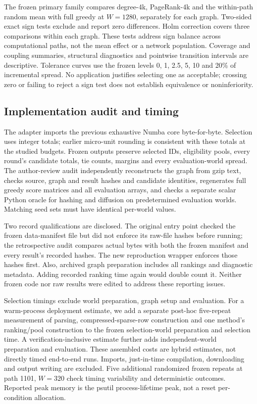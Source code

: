 \documentclass[smallextended]{svjour3}
\begin{document}
The frozen primary family compares degree-4k, PageRank-4k and the within-path random mean with full greedy at $W=1280$, separately for each graph. Two-sided exact sign tests exclude and report zero differences. Holm correction covers three comparisons within each graph. These tests address sign balance across computational paths, not the mean effect or a network population. Coverage and coupling summaries, structural diagnostics and pointwise transition intervals are descriptive. Tolerance curves use the frozen levels 0, 1, 2.5, 5, 10 and 20\% of incremental spread. No application justifies selecting one as acceptable; crossing zero or failing to reject a sign test does not establish equivalence or noninferiority.

\subsection{Implementation audit and timing}
The adapter imports the previous exhaustive Numba core byte-for-byte. Selection uses integer totals; earlier micro-unit rounding is consistent with these totals at the studied budgets. Frozen outputs preserve selected IDs, eligibility pools, every round's candidate totals, tie counts, margins and every evaluation-world spread. The author-review audit independently reconstructs the graph from gzip text, checks source, graph and result hashes and candidate identities, regenerates full greedy score matrices and all evaluation arrays, and checks a separate scalar Python oracle for hashing and diffusion on predetermined evaluation worlds. Matching seed sets must have identical per-world values.

Two record qualifications are disclosed. The original entry point checked the frozen data-manifest file but did not enforce its raw-file hashes before running; the retrospective audit compares actual bytes with both the frozen manifest and every result's recorded hashes. The new reproduction wrapper enforces those hashes first. Also, archived graph preparation includes all rankings and diagnostic metadata. Adding recorded ranking time again would double count it. Neither frozen code nor raw results were edited to address these reporting issues.

Selection timings exclude world preparation, graph setup and evaluation. For a warm-process deployment estimate, we add a separate post-hoc five-repeat measurement of parsing, compressed-sparse-row construction and one method's ranking/pool construction to the frozen selection-world preparation and selection time. A verification-inclusive estimate further adds independent-world preparation and evaluation. These assembled costs are hybrid estimates, not directly timed end-to-end runs. Imports, just-in-time compilation, downloading and output writing are excluded. Five additional randomized frozen repeats at path 1101, $W=320$ check timing variability and deterministic outcomes. Reported peak memory is the psutil process-lifetime peak, not a reset per-condition allocation.
\end{document}
